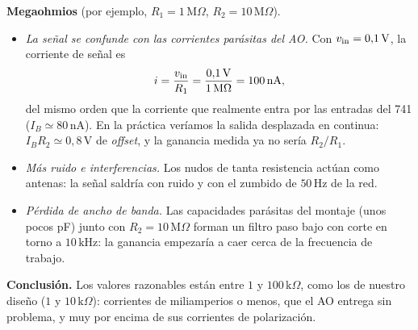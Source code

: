 \begin{respuesta}
\textbf{Megaohmios} (por ejemplo, $R_1=1\,\mathrm{M}\Omega$, $R_2=10\,\mathrm{M}\Omega$).
\begin{itemize}
  \item \emph{La señal se confunde con las corrientes parásitas del AO.} Con $v_{\mathrm{in}}=0{,}1\,\mathrm{V}$, la corriente de señal es
        \begin{equation}\label{eq:r-IB}
          i=\frac{v_{\mathrm{in}}}{R_1}=\frac{0{,}1\,\mathrm{V}}{1\,\mathrm{M}\Omega}=100\,\mathrm{nA},
        \end{equation}
        del mismo orden que la corriente que realmente entra por las entradas del 741 ($I_B\simeq80\,\mathrm{nA}$).
        En la práctica veríamos la salida desplazada en continua: $I_BR_2\simeq0{,}8\,\mathrm{V}$ de \emph{offset}, y la
        ganancia medida ya no sería $R_2/R_1$.
  \item \emph{Más ruido e interferencias.} Los nudos de tanta resistencia actúan como antenas: la señal saldría
        con ruido y con el zumbido de $50\,\mathrm{Hz}$ de la red.
  \item \emph{Pérdida de ancho de banda.} Las capacidades parásitas del montaje (unos pocos pF) junto con
        $R_2=10\,\mathrm{M}\Omega$ forman un filtro paso bajo con corte en torno a $10\,\mathrm{kHz}$: la ganancia empezaría a
        caer cerca de la frecuencia de trabajo.
\end{itemize}

\textbf{Conclusión.} Los valores razonables están entre $1$ y $100\,\mathrm{k}\Omega$, como los de nuestro diseño
($1$ y $10\,\mathrm{k}\Omega$): corrientes de miliamperios o menos, que el AO entrega sin problema, y muy por encima
de sus corrientes de polarización.
\end{respuesta}
